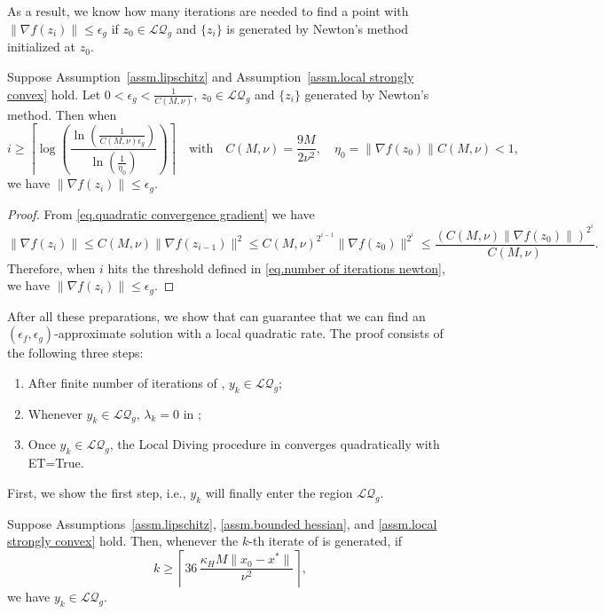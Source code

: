 \documentclass{article}
\begin{document}
As a result, we know how many iterations are needed to find a point with $\|\nabla f(z_i)\|\leq \epsilon_g$ if $z_0 \in \mathcal{LQ}_g$ and $\{z_i\}$ is generated by Newton's method initialized at $z_0$.
\begin{corollary}
    \label{lem.number of iterations newton}
    Suppose Assumption~\ref{assm.lipschitz} and Assumption~\ref{assm.local strongly convex} hold. Let $0<\epsilon_g< \frac{1}{C(M,\nu)}$, $z_0\in\mathcal{LQ}_g$ and $\{z_i\}$ generated by Newton's method. Then when
    \begin{equation}
        \label{eq.number of iterations newton}
        i\geq \left\lceil \log\left( \frac{\ln\left(\tfrac{1}{C(M,\nu)\epsilon_g}\right)}{\ln\left(\tfrac{1}{\eta_0}\right)} \right) \right\rceil \quad \text{with} \quad C(M,\nu) = \frac{9M}{2\nu^2}, \quad \eta_0 = \|\nabla f(z_0)\| C(M,\nu)<1,
    \end{equation}
    we have $\|\nabla f(z_i)\|\leq \epsilon_g$.
\end{corollary}
\begin{proof}
    From \eqref{eq.quadratic convergence gradient} we have
    \begin{equation*}
        \|\nabla f(z_i)\| \leq C(M,\nu)\|\nabla f(z_{i-1})\|^2 \leq C(M,\nu)^{2^{i-1}} \|\nabla f(z_0)\|^{2^i} \leq \frac{(C(M,\nu)\|\nabla f(z_0)\|)^{2^i}}{C(M,\nu)}.
    \end{equation*}
    Therefore, when $i$ hits the threshold defined in \eqref{eq.number of iterations newton}, we have $\|\nabla f(z_i)\|\leq \epsilon_g$.
\end{proof}
After all these preparations, we show that  can guarantee that we can find an $(\epsilon_f,\epsilon_g)$-approximate solution with a local quadratic rate. The proof consists of the following three steps:
\begin{enumerate}[label=(\roman*)]
    \item After finite number of iterations of , $y_k\in\mathcal{LQ}_g$;
    \item Whenever $y_k\in\mathcal{LQ}_g$, $\lambda_k=0$ in ;
    \item Once $y_k\in \mathcal{LQ}_g$, the Local Diving procedure in  converges quadratically with ET=True.
\end{enumerate}
First, we show the first step, i.e., $y_k$ will finally enter the region $\mathcal{LQ}_g$.
\begin{lemma}\label{lem.enter region}
    Suppose Assumptions~\ref{assm.lipschitz}, \ref{assm.bounded hessian},
    and \ref{assm.local strongly convex} hold. Then, whenever the $k$-th iterate of
     is generated, if
    \[
        k\geq
        \left\lceil
        36\,\frac{\kappa_H M \|x_0-x^*\|}{\nu^2}
        \right\rceil,
    \]
    we have $y_k\in\mathcal{LQ}_g$.
\end{lemma}
\end{document}
